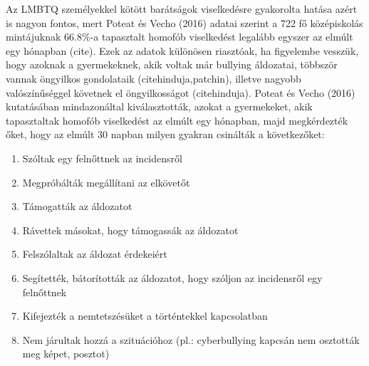 Az LMBTQ személyekkel kötött barátságok viselkedésre gyakorolta hatása azért is nagyon fontos, mert Poteat és Vecho (2016) adatai szerint a 722 fő középiskolás mintájuknak 66.8\%-a tapasztalt homofób viselkedést legalább egyszer az elmúlt egy hónapban (cite). Ezek az adatok különösen riasztóak, ha figyelembe vesszük, hogy azoknak a gyermekeknek, akik voltak már bullying áldozatai, többször vannak öngyilkos gondolataik (citehinduja,patchin), illetve nagyobb valószínűséggel követnek el öngyilkosságot (citehinduja). Poteat és Vecho (2016) kutatásában   mindazonáltal kiválasztották, azokat a gyermekeket, akik tapasztaltak homofób viselkedést az elmúlt egy hónapban, majd megkérdezték őket, hogy az elmúlt 30 napban milyen gyakran csinálták a következőket:
\begin{enumerate}
	\item Szóltak egy felnőttnek az incidensről 
	\item Megpróbálták megállítani az elkövetőt 
	\item Támogatták az áldozatot 
	\item Rávettek másokat, hogy támogassák az áldozatot 
	\item Felszólaltak az áldozat érdekeiért 
	\item Segítették, bátorították az áldozatot, hogy szóljon az incidensről egy felnőttnek 
	\item Kifejezték a nemtetszésüket a történtekkel kapcsolatban 
	\item Nem járultak hozzá a szituációhoz (pl.: cyberbullying kapcsán nem osztották meg képet, posztot)
\end{enumerate}

